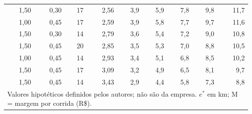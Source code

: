 \begin{tabular}{rrrrrrrrr}
1{,}50 & 0{,}30 & 17 & 2{,}56 & 3{,}9 & 5{,}9 & 7{,}8 & 9{,}8 & 11{,}7 \\
1{,}00 & 0{,}45 & 17 & 2{,}59 & 3{,}9 & 5{,}8 & 7{,}7 & 9{,}7 & 11{,}6 \\
1{,}50 & 0{,}30 & 14 & 2{,}79 & 3{,}6 & 5{,}4 & 7{,}2 & 9{,}0 & 10{,}8 \\
1{,}50 & 0{,}45 & 20 & 2{,}85 & 3{,}5 & 5{,}3 & 7{,}0 & 8{,}8 & 10{,}5 \\
1{,}00 & 0{,}45 & 14 & 2{,}93 & 3{,}4 & 5{,}1 & 6{,}8 & 8{,}5 & 10{,}2 \\
1{,}50 & 0{,}45 & 17 & 3{,}09 & 3{,}2 & 4{,}9 & 6{,}5 & 8{,}1 & 9{,}7 \\
1{,}50 & 0{,}45 & 14 & 3{,}43 & 2{,}9 & 4{,}4 & 5{,}8 & 7{,}3 & 8{,}8 \\
\hline
\multicolumn{9}{l}{\footnotesize Valores hipotéticos definidos pelos autores; não são da empresa. $e^*$ em km; M = margem por corrida (R\$).} \\
\end{tabular}
